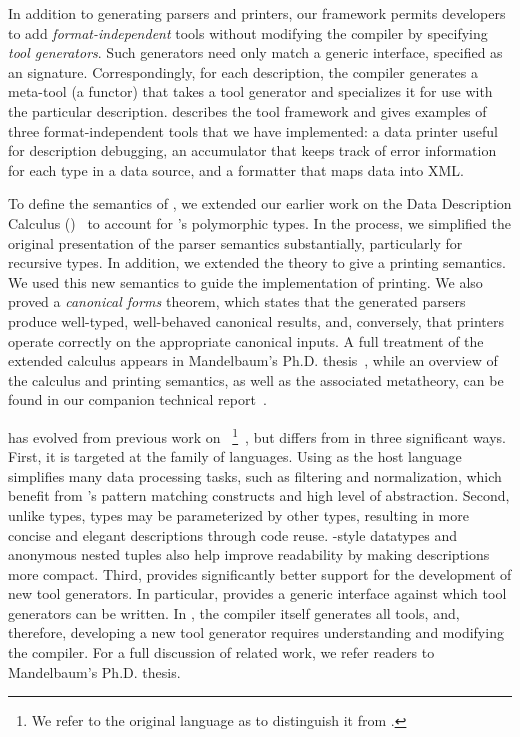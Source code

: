 In addition to generating parsers and printers, our framework permits
developers to add {\em format-independent} tools without modifying the \padsml{} compiler by specifying \textit{tool generators}.  Such generators need only match a generic interface, specified as an \ml{} signature.  
Correspondingly, for each \padsml{} description, the \padsml{} compiler generates a meta-tool (a functor)
that takes a tool generator and specializes it for use with
the particular description.   describes the
tool framework and gives examples of three format-independent 
tools that we have
implemented: a data printer useful for description debugging,
an accumulator that keeps track of error information for
each type in a data source, and a formatter that maps data into XML.

To define the semantics of \padsml{}, we extended our earlier work on
the Data Description Calculus (\ddcold{})~\cite{fisher+:next700ddl} to
account for \padsml{}'s polymorphic types.  In the process, we
simplified the original presentation of the parser semantics
substantially, particularly for recursive types.  In addition, we
extended the theory to give a printing semantics. We used this new
semantics to guide the \padsml{} implementation of printing.  We 
also proved a {\em canonical forms} theorem, which states 
that the generated parsers produce well-typed, well-behaved canonical
results, and, conversely, that printers operate correctly on the 
appropriate canonical
inputs. A full treatment of the extended calculus appears in
Mandelbaum's Ph.D. thesis~\cite{mandelbaum-thesis}, while an overview of
the calculus and printing semantics, as well as the associated
metatheory, can be found in our companion technical
report~\cite{fisher+:popl-sub-long}.


\padsml{} has evolved from previous work on
\padsc{}~\footnote{We refer to the original
\pads{} language as \padsc{} to distinguish it from \padsml{}.}~\cite{fisher+:pads}, but
\padsml{} differs from \padsc{} in three significant ways.  First, it
is targeted at the \ml{} family of languages.  Using \ml{} as the host
language simplifies many data processing tasks, such as filtering and normalization, 
which benefit from \ml{}'s pattern matching constructs and
high level of abstraction.  Second, unlike \padsc{} types, \padsml{}
types may be parameterized by other types, resulting in more concise
and elegant descriptions through code reuse.  \ml{}-style datatypes and 
anonymous nested tuples also help improve readability by making descriptions more compact.  Third, \padsml{} provides
significantly better support for the development of new tool generators.
In particular, \padsml{} provides a generic interface against which
tool generators can be written.  In \padsc{}, the compiler itself
generates all tools, and, therefore, developing a new tool generator
requires understanding and modifying the compiler.
For a full discussion of related work, we refer readers to
Mandelbaum's Ph.D. thesis\cite{mandelbaum-thesis}.


